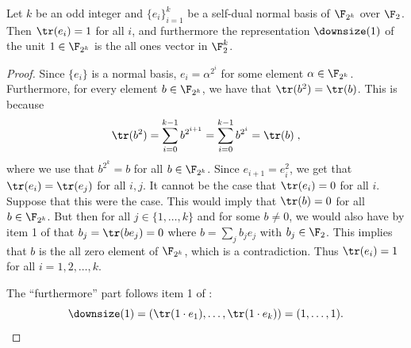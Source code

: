 \begin{lemma}
  \label{lem:one}
  Let $k$ be an odd integer and $\{e_i\}_{i=1}^k$ be a self-dual normal basis of
  $\F_{2^k}$ over $\F_2$.
  Then $\tr(e_i) = 1$ for all $i$, and furthermore the representation
  $\downsize(1)$ of the unit $1 \in \F_{2^k}$ is the all ones vector in
  $\F_2^k$.
\end{lemma}

\begin{proof}
  Since $\{e_i \}$ is a normal basis, $e_i = \alpha^{2^i}$ for some element
  $\alpha \in \F_{2^k}$.
  Furthermore, for every element $b \in \F_{2^k}$, we have that $\tr(b^2) =
  \tr(b)$.
  This is because
  \[
    \tr(b^2) = \sum_{i=0}^{k-1} b^{2^{i+1}} =
    \sum_{i = 0}^{k-1} b^{2^i} = \tr(b)\;,
  \]
  where we use that $b^{2^k} = b$ for all $b \in \F_{2^k}$.
  Since $e_{i+1} = e_i^2$, we get that $\tr(e_i) = \tr(e_j)$ for all $i,j$.
  It cannot be the case that $\tr(e_i) = 0$ for all $i$.
  Suppose that this were the case.
  This would imply that $\tr(b) = 0$ for all $b \in \F_{2^k}$.
  But then for all $j \in \{1, \ldots, k\}$ and for some $b \neq 0$, we would
  also have by item 1 of  that $b_j = \tr(b e_j) = 0$ where $b = \sum_j b_j e_j$ with $b_j \in
  \F_2$.
  This implies that $b$ is the all zero element of $\F_{2^k}$, which is a
  contradiction.
  Thus $\tr(e_i) = 1$ for all $i=1, 2, \ldots, k$.

	The ``furthermore'' part follows item 1 of
        :
        \begin{equation*}
          \downsize(1) = (\tr(1 \cdot e_1), \dots, \tr(1 \cdot e_k))
          = (1, \dots, 1).
        \end{equation*}
\end{proof}


